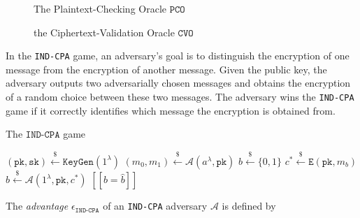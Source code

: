 \documentclass[floatrow,journal=tches,submission]{iacrtrans}
\newcommand{\monospace}{\texttt}
\newcommand{\keygen}{\monospace{KeyGen}}
\newcommand{\encrypt}{\monospace{E}}
\newcommand{\decrypt}{\monospace{D}}
\newcommand{\pk}{\monospace{pk}}
\newcommand{\sk}{\monospace{sk}}
\newcommand{\pco}{\monospace{PCO}}
\newcommand{\cvo}{\monospace{CVO}}
\newcommand{\leftsample}{\stackrel{\$}{\leftarrow}}
\newcommand{\llbrack}{[\![}
\newcommand{\rrbrack}{]\!]}
\begin{document}
\begin{figure}
    \begin{floatrow}
        \ffigbox{
            \begin{algorithm}[H]
                \caption{$\pco(m \in \mathcal{M}, c \in \mathcal{C})$}\label{alg:pco}
                \begin{algorithmic}[1]
                    \State \Return $\llbrack \decrypt(\sk, c) = m \rrbrack$
                \end{algorithmic}
            \end{algorithm}
        }
        {\caption{The Plaintext-Checking Oracle $\pco$}}
        \ffigbox{
            \begin{algorithm}[H]
                \caption{$\cvo(c \in \mathcal{C})$}\label{alg:cvo}
                \begin{algorithmic}[1]
                    \State \Return $\llbrack \decrypt(\sk, c) \in \mathcal{M} \rrbrack$
                \end{algorithmic}
            \end{algorithm}
        }
        {\caption{the Ciphertext-Validation Oracle $\cvo$}}
    \end{floatrow}
    \label{fig:pco-and-cvo}
\end{figure}

In the \monospace{IND-CPA} game, an adversary's goal is to distinguish the encryption of one message from the encryption of another message. Given the public key, the adversary outputs two adversarially chosen messages and obtains the encryption of a random choice between these two messages. The adversary wins the \monospace{IND-CPA} game if it correctly identifies which message the encryption is obtained from.

\begin{algorithm}
    \caption{The $\monospace{IND-CPA}$ game}\label{alg:pke-ind-cpa-game}

    \begin{algorithmic}[1]
        \State $(\pk, \sk) \leftsample \keygen(1^\lambda)$
        \State $(m_0, m_1) \leftsample \mathcal{A}(a^\lambda, \pk)$
        \State $b \leftsample \{0, 1\}$
        \State $c^\ast \leftsample \encrypt(\pk, m_b)$
        \State $\hat{b} \leftsample \mathcal{A}(1^\lambda, \pk, c^\ast)$
        \State \Return $\llbrack b = \hat{b} \rrbrack$
    \end{algorithmic}
\end{algorithm}

The \textit{advantage} $\epsilon_\monospace{IND-CPA}$ of an \monospace{IND-CPA} adversary $\mathcal{A}$ is defined by
\end{document}
